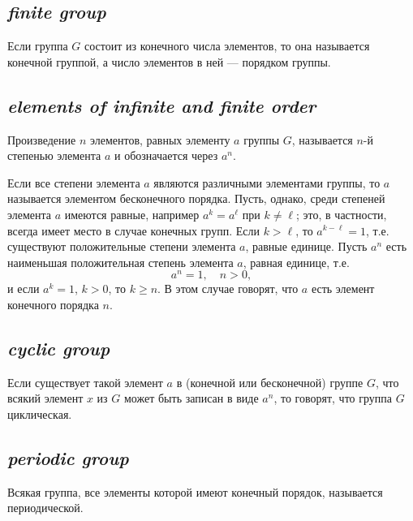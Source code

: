 \subsection*{ \textit{finite group}}
\begin{rusblock}
Если группа $G$ состоит из конечного числа элементов, то она называется конечной группой, а число элементов в ней --- порядком группы.
\end{rusblock}

\subsection*{ \textit{elements of infinite and finite order}}
\begin{rusblock}
Произведение $n$ элементов, равных элементу $a$ группы $G$, называется $n$-й степенью элемента $a$ и обозначается через $a^n$.

Если все степени элемента $a$ являются различными элементами группы, то $a$ называется элементом бесконечного порядка. Пусть, однако, среди степеней элемента $a$ имеются равные, например $a^k=a^\ell$ при $k\ne\ell$; это, в частности, всегда имеет место в случае конечных групп. Если $k>\ell$, то $a^{k-\ell}=1$, т.е. существуют положительные степени элемента $a$, равные единице. Пусть $a^n$ есть наименьшая положительная степень элемента $a$, равная единице, т.е.
\[
a^n=1,\quad n>0,
\]
и если $a^k=1$, $k>0$, то $k\ge n$. В этом случае говорят, что $a$ есть элемент конечного порядка $n$.
\end{rusblock}

\subsection*{ \textit{cyclic group}}
\begin{rusblock}
Если существует такой элемент $a$ в (конечной или бесконечной) группе $G$, что всякий элемент $x$ из $G$ может быть записан в виде $a^n$, то говорят, что группа $G$ циклическая.
\end{rusblock}

\subsection*{ \textit{periodic group}}
\begin{rusblock}
Всякая группа, все элементы которой имеют конечный порядок, называется периодической.
\end{rusblock}


